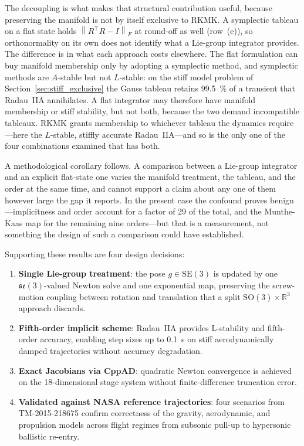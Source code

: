 \documentclass[a4paper,10pt]{article}
\newcommand{\SO}{\mathrm{SO}(3)}
\newcommand{\SE}{\mathrm{SE}(3)}
\newcommand{\se}{\mathfrak{se}(3)}
\newcommand{\R}{\mathbb{R}}
\newcommand{\norm}[1]{\left\lVert #1 \right\rVert}
\theoremstyle{definition}
\begin{document}
The decoupling is what makes that structural contribution useful, because
preserving the manifold is not by itself exclusive to RKMK.  A symplectic
tableau on a flat state holds $\norm{R^\top R - I}_F$ at round-off as well
(row~(e)), so orthonormality on its own does not identify what a Lie-group
integrator provides.  The difference is in what each approach costs elsewhere.
The flat formulation can buy manifold membership only by adopting a symplectic
method, and symplectic methods are $A$-stable but not $L$-stable: on the stiff
model problem of Section~\ref{sec:stiff_exclusive} the Gauss tableau retains
\SI{99.5}{\percent} of a transient that Radau~IIA annihilates.  A flat
integrator may therefore have manifold membership or stiff stability, but not
both, because the two demand incompatible tableaux.  RKMK grants membership to
whichever tableau the dynamics require---here the $L$-stable, stiffly accurate
Radau~IIA---and so is the only one of the four combinations examined that has
both.

A methodological corollary follows.  A comparison between a Lie-group
integrator and an explicit flat-state one varies the manifold treatment, the
tableau, and the order at the same time, and cannot support a claim about any
one of them however large the gap it reports.  In the present case the
confound proves benign---implicitness and order account for a factor of
\num{29} of the total, and the Munthe-Kaas map for the remaining nine
orders---but that is a measurement, not something the design of such a
comparison could have established.

Supporting these results are four design decisions:

\begin{enumerate}[leftmargin=*, label=(\arabic*)]
  \item \textbf{Single Lie-group treatment}: the pose $g \in \SE$ is updated
    by one $\se$-valued Newton solve and one exponential map, preserving the
    screw-motion coupling between rotation and translation that a split
    $\SO \times \R^3$ approach discards.
  \item \textbf{Fifth-order implicit scheme}: Radau~IIA provides L-stability
    and fifth-order accuracy, enabling step sizes up to \SI{0.1}{s} on stiff
    aerodynamically damped trajectories without accuracy degradation.
  \item \textbf{Exact Jacobians via CppAD}: quadratic Newton convergence is
    achieved on the 18-dimensional stage system without finite-difference
    truncation error.
  \item \textbf{Validated against NASA reference trajectories}: four scenarios
    from TM-2015-218675 confirm correctness of the gravity, aerodynamic, and
    propulsion models across flight regimes from subsonic pull-up to hypersonic
    ballistic re-entry.
\end{enumerate}
\end{document}
